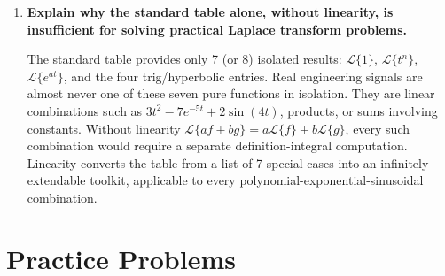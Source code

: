 \documentclass[12pt,a4paper]{article}
\begin{document}
\begin{enumerate}[leftmargin=*, label=\textbf{\arabic*.}]
By linearity:
$\mathcal{L}\{3t^2\} = 3 \cdot 2!/s^3 = 6/s^3$ (using $\mathcal{L}\{t^n\} = n!/s^{n+1}$ with $n=2$).
$\mathcal{L}\{-5e^{2t}\} = -5 \cdot 1/(s-2) = -5/(s-2)$ (using $\mathcal{L}\{e^{at}\}$, $a=2$, valid $s>2$).
$\mathcal{L}\{\cos(t)\} = s/(s^2+1)$ (using $\mathcal{L}\{\cos(at)\}$, $a=1$).
Combining: $\mathcal{L}\{3t^2 - 5e^{2t} + \cos(t)\} = 6/s^3 - 5/(s-2) + s/(s^2+1)$, valid for $s > 2$.

\item \textbf{Explain why the standard table alone, without linearity, is insufficient for solving
practical Laplace transform problems.}

The standard table provides only 7 (or 8) isolated results: $\mathcal{L}\{1\}$, $\mathcal{L}\{t^n\}$,
$\mathcal{L}\{e^{at}\}$, and the four trig/hyperbolic entries. Real engineering signals are
almost never one of these seven pure functions in isolation. They are linear combinations
such as $3t^2 - 7e^{-5t} + 2\sin(4t)$, products, or sums involving constants. Without
linearity $\mathcal{L}\{af+bg\} = a\mathcal{L}\{f\} + b\mathcal{L}\{g\}$, every such combination
would require a separate definition-integral computation. Linearity converts the table from
a list of 7 special cases into an infinitely extendable toolkit, applicable to every
polynomial-exponential-sinusoidal combination.

\end{enumerate}

\section{Practice Problems}
\end{document}
